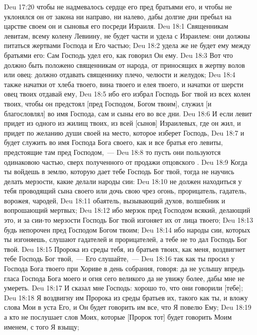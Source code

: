 \vs Deu 17:20 чтобы не надмевалось сердце его пред братьями его, и чтобы не уклонялся он от закона ни направо, ни налево, дабы долгие дни пребыл на царстве своем он и сыновья его посреди Израиля.
\vs Deu 18:1 Священникам левитам, всему колену Левиину, не будет части и удела с Израилем: они должны питаться жертвами Господа и Его частью;
\vs Deu 18:2 удела же не будет ему между братьями его: Сам Господь удел его, как говорил Он ему.
\vs Deu 18:3 Вот что должно быть положено священникам от народа, от приносящих в жертву волов или овец: должно отдавать священнику плечо, челюсти и желудок;
\vs Deu 18:4 также начатки от хлеба твоего, вина твоего и елея твоего, и начатки от шерсти овец твоих отдавай ему,
\vs Deu 18:5 ибо его избрал Господь Бог твой из всех колен твоих, чтобы он предстоял [пред Господом, Богом твоим], служил [и благословлял] во имя Господа, сам и сыны его во все дни.
\vs Deu 18:6 И если левит придет из одного из жилищ твоих, из всей  [сынов] Израилевых, где он жил, и придет по желанию души своей на место, которое изберет Господь,
\vs Deu 18:7 и будет служить во имя Господа Бога своего, как и все братья его левиты, предстоящие там пред Господом,~---
\vs Deu 18:8 то пусть они пользуются одинаковою частью, сверх полученного от продажи отцовского .
\rsbpar\vs Deu 18:9 Когда ты войдешь в землю, которую дает тебе Господь Бог твой, тогда не научись делать мерзости, какие делали народы сии:
\vs Deu 18:10 не должен находиться у тебя проводящий сына своего или дочь свою чрез огонь, прорицатель, гадатель, ворожея, чародей,
\vs Deu 18:11 обаятель, вызывающий духов, волшебник и вопрошающий мертвых;
\vs Deu 18:12 ибо мерзок пред Господом всякий, делающий это, и за сии-то мерзости Господь Бог твой изгоняет их от лица твоего;
\vs Deu 18:13 будь непорочен пред Господом Богом твоим;
\vs Deu 18:14 ибо народы сии, которых ты изгоняешь, слушают гадателей и прорицателей, а тебе не то дал Господь Бог твой.
\vs Deu 18:15 Пророка из среды тебя, из братьев твоих, как меня, воздвигнет тебе Господь Бог твой,~--- Его слушайте,~---
\vs Deu 18:16 так как ты просил у Господа Бога твоего при Хориве в день собрания, говоря: да не услышу впредь гласа Господа Бога моего и огня сего великого да не увижу более, дабы мне не умереть.
\vs Deu 18:17 И сказал мне Господь: хорошо то, что они говорили [тебе];
\vs Deu 18:18 Я воздвигну им Пророка из среды братьев их, такого как ты, и вложу слова Мои в уста Его, и Он будет говорить им все, что Я повелю Ему;
\vs Deu 18:19 а кто не послушает слов Моих, которые [Пророк тот] будет говорить Моим именем, с того Я взыщу;
